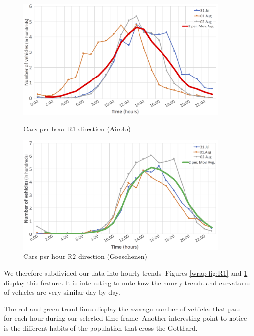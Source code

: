\documentclass[11pt,a4paper,parskip=half-]{article}
\begin{document}
\clearpage


\begin{figure}
\includegraphics[width=10.5cm]{Trend_R1}
\vspace*{-8mm}
\caption{Cars per hour R1 direction (Airolo)}
\label{wrap-fig:R1}
\vspace{2.5cm}




\includegraphics[width=10.5cm]{Trend_R2}
\vspace*{-8mm}
\caption{Cars per hour R2 direction (Goeschenen)}
\label{wrap-fig:R2}

\end{figure}


We therefore subdivided our data into hourly trends. Figures \ref{wrap-fig:R1} and \ref{wrap-fig:R2} display this feature. It is interesting to note how the hourly trends and curvatures of vehicles are very similar day by day. 





The red and green trend lines display the average number of vehicles that pass for each hour during our selected time frame. Another interesting point to notice is the different habits of the population that cross the Gotthard. 
\end{document}
